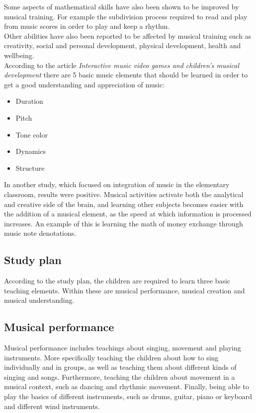 	Some aspects of mathematical skills have also been shown to be improved by musical training. For example the subdivision process required to read and play from music scores in order to play and keep a rhythm\cite{powerOfMusic}.\\
	
	Other abilities have also been reported to be affected by musical training such as creativity, social and personal development, physical development, health and wellbeing\cite{powerOfMusic}.\\
	
	According to the article \textit{Interactive music video games and children's musical development} there are 5 basic music elements that should be learned in order to get a good understanding and appreciation of music\cite[p.~99]{interactiveMusicVideoGames}:
	\begin{itemize}\label{list:basicMusic}
		\item Duration
		\item Pitch
		\item Tone color
		\item Dynamics
		\item Structure\\
	\end{itemize}
	
	In another study, which focused on integration of music in the elementary classroom, results were positive. Musical activities activate both the analytical and creative side of the brain, and learning other subjects becomes easier with the addition of a musical element, as the speed at which information is processed increases. An example of this is learning the math of money exchange through music note denotations\cite{musicIntegration}.
	
	\subsection{Study plan}
	
	According to the study plan, the children are required to learn three basic teaching elements. Within these are musical performance, musical creation and musical understanding.
	
	\subsection*{Musical performance}
	Musical performance includes teachings about singing, movement and playing instruments. More specifically teaching the children about how to sing individually and in groups, as well as teaching them about different kinds of singing and songs. Furthermore, teaching the children about movement in a musical context, such as dancing and rhythmic movement. Finally, being able to play the basics of different instruments, such as drums, guitar, piano or keyboard and different wind instruments.
	
